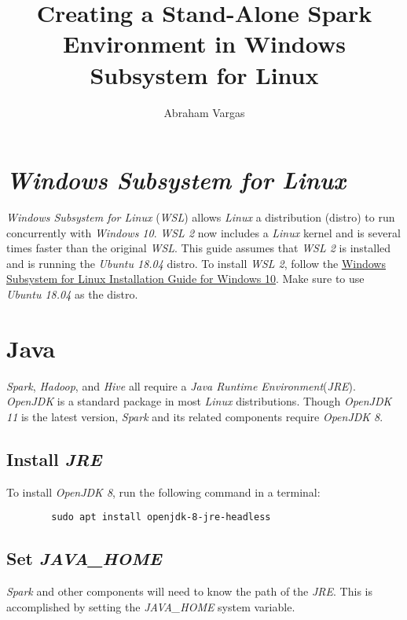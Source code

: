 \documentclass{article}
\begin{document}
\title{Creating a Stand-Alone Spark Environment in Windows Subsystem for Linux}
\author{Abraham Vargas}
\maketitle

\newpage
\tableofcontents
\newpage

\section{\emph{Windows Subsystem for Linux}}
\emph{Windows Subsystem for Linux} (\emph{WSL}) allows \emph{Linux} a distribution (distro) to
run concurrently with \emph{Windows 10}. \emph{WSL 2} now includes a \emph{Linux}
kernel and is several times faster than the original \emph{WSL}. This guide assumes that \emph{WSL 2}
is installed and is running the \emph{Ubuntu 18.04} distro. To install \emph{WSL 2}, follow the
\href{https://docs.microsoft.com/en-us/windows/wsl/install-win10}{Windows Subsystem for Linux Installation Guide for Windows 10}.
Make sure to use \emph{Ubuntu 18.04} as the distro.

\section{Java}
\emph{Spark}, \emph{Hadoop}, and \emph{Hive} all require a \emph{Java Runtime Environment}(\emph{JRE}).
\emph{OpenJDK} is a standard package in most \emph{Linux} distributions. Though \emph{OpenJDK 11}
is the latest version, \emph{Spark} and its related components require \emph{OpenJDK 8}.

    \subsection{Install \emph{JRE}}
    To install \emph{OpenJDK 8}, run the following command in a terminal:
    \begin{verbatim}
        sudo apt install openjdk-8-jre-headless            
    \end{verbatim}

    \subsection{Set \emph{JAVA\_HOME}}
    \emph{Spark} and other components will need to know the path of the
    \emph{JRE}. This is accomplished by setting the \emph{JAVA\_HOME}
    system variable.
\end{document}
